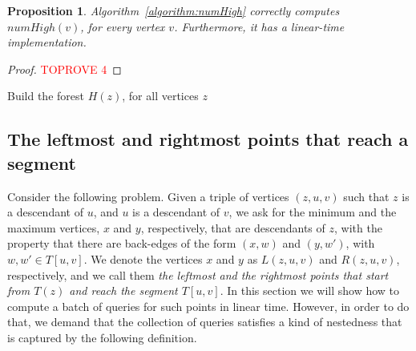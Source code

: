 \documentclass[11pt,a4paper]{article}
\newtheorem{proposition}[theorem]{Proposition}
\begin{document}
\begin{proposition}
Algorithm~\ref{algorithm:numHigh} correctly computes $\mathit{numHigh}(v)$, for every vertex $v$. Furthermore, it has a linear-time implementation.
\end{proposition}
\begin{proof}\textcolor{red}{TOPROVE 4}\end{proof}  

\begin{algorithm}[h]
\caption{\textsf{Build the forest $H(z)$, for all vertices $z$}}
\label{algorithm:H(z)forest}
\LinesNumbered
\DontPrintSemicolon


\end{algorithm}

\subsection{The leftmost and rightmost points that reach a segment}
\label{section:leftmostReachSegment}
Consider the following problem. Given a triple of vertices $(z,u,v)$ such that $z$ is a descendant of $u$, and $u$ is a descendant of $v$, we ask for the minimum and the maximum vertices, $x$ and $y$, respectively, that are descendants of $z$, with the property that there are back-edges of the form $(x,w)$ and $(y,w')$, with $w,w'\in T[u,v]$. We denote the vertices $x$ and $y$ as $L(z,u,v)$ and $R(z,u,v)$, respectively, and we call them \emph{the leftmost and the rightmost points that start from $T(z)$ and reach the segment $T[u,v]$}. In this section we will show how to compute a batch of queries for such points in linear time. However, in order to do that, we demand that the collection of queries satisfies a kind of nestedness that is captured by the following definition.
\end{document}

